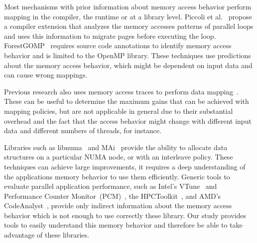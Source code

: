 

Most mechanisms with prior information about memory access behavior perform
mapping in the compiler, the runtime or at a library level.
Piccoli et al.~\cite{Piccoli2014} propose a compiler extension that analyzes
the memory accesses patterns of parallel loops and uses this information to migrate
pages before executing the loop.
ForestGOMP~\cite{Broquedis2010a} requires source code annotations to identify memory access behavior and is limited to the OpenMP library.
These techniques use predictions about the memory access behavior, which might be dependent on input data and can cause wrong mappings.

Previous research also uses memory access traces to perform data mapping~\cite{Diener2015,Marathe2010,Bolosky1992}. These can be useful to determine the maximum gains that can be achieved with mapping policies, but are not applicable in general due to their substantial overhead and the fact that the access behavior might change with different input data and different numbers of threads, for instance.


Libraries such as libnuma~\cite{Kleen2004} and MAi~\cite{Ribeiro2009} provide
the ability to allocate data structures on a particular NUMA node, or with an
interleave policy. These techniques can achieve large improvements, it
requires a deep understanding of the applications memory behavior to use them
efficiently.
Generic tools to evaluate parallel application performance, such as Intel's
VTune~\cite{Reinders05VTune} and Performance Counter
Monitor~(PCM)~\cite{Intel2012b}, the HPCToolkit~\cite{Adhianto10HPCTOOLKIT},
and AMD's CodeAnalyst~\cite{Drongowski2008}, provide only indirect information
about the memory access behavior which is not enough to use correctly these
library. Our study provides tools to easily understand this memory behavior
and therefore be able to take advantage of these libraries.

